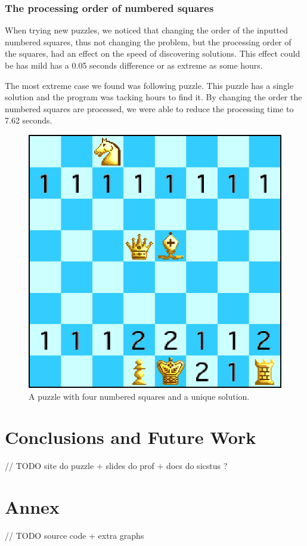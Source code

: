 \documentclass[runningheads]{llncs}
\begin{document}
\subsubsection{The processing order of numbered squares}
When trying new puzzles, we noticed that changing the order of the inputted
numbered squares, thus not changing the problem, but the processing order
of the squares, had an effect on the speed of discovering solutions. This
effect could be has mild has a 0.05 seconds difference or as extreme as some
hours.

The most extreme case we found was following puzzle. This puzzle has a single
solution and the program was tacking hours to find it. By changing the order
the numbered squares are processed, we were able to reduce the processing time
to 7.62 seconds.

\begin{figure}[H]
  \centering
  \includegraphics[width=0.5\linewidth]{figures/chess7.eps}
  \caption{A puzzle with four numbered squares and a unique solution.}\label{fig:fig6}
\end{figure}

\section{Conclusions and Future Work}

// TODO site do puzzle + slides do prof + docs do sicstus ?
\begin{thebibliography}{8}




\end{thebibliography}

\section{Annex}

// TODO source code + extra graphs
\end{document}
